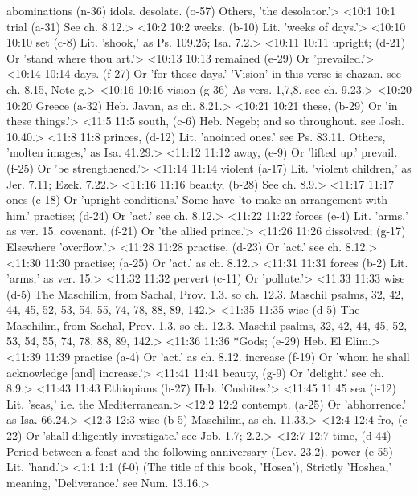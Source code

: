   abominations (n-36)  idols.
  desolate. (o-57)  Others, 'the desolator.'>
<10:1 10:1  trial (a-31)  See ch. 8.12.>
<10:2 10:2  weeks. (b-10)  Lit. 'weeks of days.'>
<10:10 10:10  set (c-8)  Lit. 'shook,' as Ps. 109.25; Isa. 7.2.>
<10:11 10:11  upright; (d-21)  Or 'stand where thou art.'>
<10:13 10:13  remained (e-29)  Or 'prevailed.'>
<10:14 10:14  days. (f-27)  Or 'for those days.' 'Vision' in this verse is chazan. see  ch. 8.15, Note g.>
<10:16 10:16  vision (g-36)  As vers. 1,7,8. see ch. 9.23.>
<10:20 10:20  Greece (a-32)  Heb. Javan, as ch. 8.21.>
<10:21 10:21  these, (b-29)  Or 'in these things.'>
<11:5 11:5  south, (c-6)  Heb. Negeb; and so throughout. see Josh. 10.40.>
<11:8 11:8  princes, (d-12)  Lit. 'anointed ones.' see Ps. 83.11. Others, 'molten images,'  as Isa. 41.29.>
<11:12 11:12  away, (e-9)  Or 'lifted up.'
  prevail. (f-25)  Or 'be strengthened.'>
<11:14 11:14  violent (a-17)  Lit. 'violent children,' as Jer. 7.11; Ezek. 7.22.>
<11:16 11:16  beauty, (b-28)  See ch. 8.9.>
<11:17 11:17  ones (c-18)  Or 'upright conditions.' Some have 'to make an arrangement  with him.'
  practise; (d-24) Or 'act.' see ch. 8.12.>
<11:22 11:22  forces (e-4)  Lit. 'arms,' as ver. 15.
  covenant. (f-21)  Or 'the allied prince.'>
<11:26 11:26  dissolved; (g-17)  Elsewhere 'overflow.'>
<11:28 11:28  practise, (d-23)  Or 'act.' see ch. 8.12.>
<11:30 11:30  practise; (a-25) Or 'act.' as ch. 8.12.>
<11:31 11:31  forces (b-2)  Lit. 'arms,' as ver. 15.>
<11:32 11:32  pervert (c-11)  Or 'pollute.'>
<11:33 11:33  wise (d-5) The Maschilim, from Sachal, Prov. 1.3. so ch. 12.3. Maschil psalms, 32, 42, 44, 45, 52, 53, 54, 55, 74, 78, 88, 89, 142.>
<11:35 11:35  wise (d-5)  The Maschilim, from Sachal, Prov. 1.3. so ch. 12.3. Maschil psalms, 32, 42, 44, 45, 52, 53, 54, 55, 74, 78, 88, 89, 142.>
<11:36 11:36  *Gods; (e-29)  Heb. El Elim.>
<11:39 11:39  practise (a-4)  Or 'act.' as ch. 8.12.
 increase (f-19)  Or 'whom he shall acknowledge [and] increase.'>
<11:41 11:41  beauty, (g-9)  Or 'delight.' see ch. 8.9.>
<11:43 11:43  Ethiopians (h-27)  Heb. 'Cushites.'>
<11:45 11:45  sea (i-12)  Lit. 'seas,' i.e. the Mediterranean.>
<12:2 12:2  contempt. (a-25)  Or 'abhorrence.' as Isa. 66.24.>
<12:3 12:3  wise (b-5)  Maschilim, as ch. 11.33.>
<12:4 12:4  fro, (c-22)  Or 'shall diligently investigate.' see Job. 1.7; 2.2.>
<12:7 12:7  time, (d-44)  Period between a feast and the following anniversary (Lev. 23.2).
  power (e-55)  Lit. 'hand.'>
<1:1 1:1   (f-0)  (The title of this book, 'Hosea'), Strictly 'Hoshea,'  meaning, 'Deliverance.' see Num. 13.16.>
